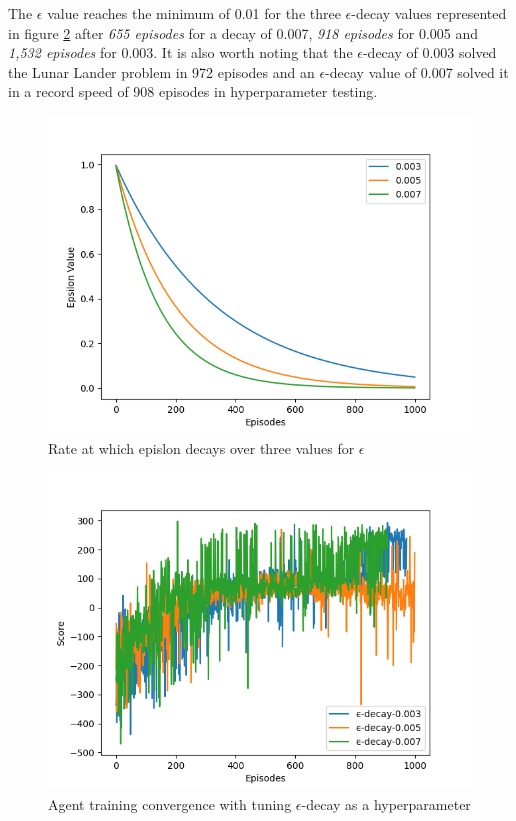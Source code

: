 \documentclass[conference]{IEEEtran}
\begin{document}
The $\epsilon$ value reaches the minimum of 0.01 for the three $\epsilon$-decay values represented in figure \ref{fig:hyperparameter-test-epsilon-decay} after \textit{655 episodes} for a decay of 0.007, \textit{918 episodes} for 0.005 and \textit{1,532 episodes} for 0.003. It is also worth noting that the $\epsilon$-decay of 0.003 solved the Lunar Lander problem in 972 episodes and an $\epsilon$-decay value of 0.007 solved it in a record speed of 908 episodes in hyperparameter testing.

\begin{figure}[]
    \centering
    \includegraphics[scale=0.45]{figs/epsilon-decay}
    \caption{Rate at which epislon decays over three values for $\epsilon$}
    \label{fig:epsilon-decay}
\end{figure}

\begin{figure}[]
    \centering
    \includegraphics[scale=0.45]{figs/hyperparameter-test-epsilon-decay}
    \caption{Agent training convergence with tuning $\epsilon$-decay as a hyperparameter }
    \label{fig:hyperparameter-test-epsilon-decay}
\end{figure}
\end{document}

